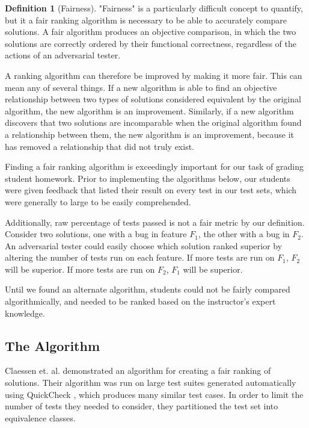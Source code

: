 \documentclass[11pt,twoside]{article}
\theoremstyle{definition}
\newtheorem{defn}{Definition}
\let\cite=\citep
\begin{document}
\begin{defn}[Fairness]

"Fairness" is a particularly difficult concept to quantify, but it a fair ranking algorithm is necessary to be able to accurately compare solutions. A fair algorithm produces an objective comparison, in which the two solutions are correctly ordered by their functional correctness, regardless of the actions of an adversarial tester.

\end{defn}

A ranking algorithm can therefore be improved by making it more fair. This can mean any of several things. If a new algorithm is able to find an objective relationship between two types of solutions considered equivalent by the original algorithm, the new algorithm is an improvement. Similarly, if a new algorithm discovers that two solutions are incomparable when the original algorithm found a relationship between them, the new algorithm is an improvement, because it has removed a relationship that did not truly exist.

Finding a fair ranking algorithm is exceedingly important for our task of grading student homework. Prior to implementing the algorithms below, our students were given feedback that listed their result on every test in our test sets, which were generally to large to be easily comprehended. 

Additionally, raw percentage of tests passed is not a fair metric by our definition. Consider two solutions, one with a bug in feature $F_1$, the other with a bug in $F_2$. An adversarial tester could easily choose which solution ranked superior by altering the number of tests run on each feature. If more tests are run on $F_1$, $F_2$ will be superior. If more tests are run on $F_2$, $F_1$ will be superior. 

Until we found an alternate algorithm, students could not be fairly compared algorithmically, and needed to be ranked based on the instructor's expert knowledge.

\subsection{The Algorithm}
Claessen et. al. demonstrated an algorithm for creating a fair ranking of solutions\cite{Claessen}. Their algorithm was run on large test suites generated automatically using QuickCheck \cite{QuickCheck}, which produces many similar test cases. In order to limit the number of tests they needed to consider, they partitioned the test set into equivalence classes.
\end{document}
